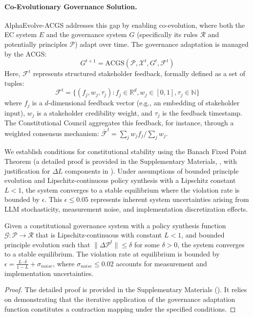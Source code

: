 \documentclass[manuscript,screen,review,anonymous,9pt]{acmart}
\begin{document}
\paragraph{Co-Evolutionary Governance Solution.} AlphaEvolve-ACGS addresses this gap by enabling co-evolution, where both the EC system $E$ and the governance system $G$ (specifically its rules $\mathcal{R}$ and potentially principles $\mathcal{P}$) adapt over time. The governance adaptation is managed by the ACGS:
\[G^{t+1} = \text{ACGS}(\mathcal{P}, \mathcal{X}^t, G^t, \mathcal{F}^t)\]
Here, $\mathcal{F}^t$ represents structured stakeholder feedback, formally defined as a set of tuples:
\[\mathcal{F}^t = \{(f_j, w_j, \tau_j) : f_j \in \mathbb{R}^d, w_j \in [0,1], \tau_j \in \mathbb{N}\}\]
where $f_j$ is a $d$-dimensional feedback vector (e.g., an embedding of stakeholder input), $w_j$ is a stakeholder credibility weight, and $\tau_j$ is the feedback timestamp. The Constitutional Council aggregates this feedback, for instance, through a weighted consensus mechanism: $\bar{\mathcal{F}}^t = \sum_{j} w_j f_j / \sum_{j} w_j$.

We establish conditions for constitutional stability using the Banach Fixed Point Theorem (a detailed proof is provided in the Supplementary Materials, , with justification for $\Delta L$ components in ). Under assumptions of bounded principle evolution and Lipschitz-continuous policy synthesis with a Lipschitz constant $L < 1$, the system converges to a stable equilibrium where the violation rate is bounded by $\epsilon$. This $\epsilon \leq 0.05$ represents inherent system uncertainties arising from LLM stochasticity, measurement noise, and implementation discretization effects.

\begin{theorem}
\label{thm:constitutional_stability}
Given a constitutional governance system with a policy synthesis function $\mathcal{G}: \mathcal{P} \rightarrow \mathcal{R}$ that is Lipschitz-continuous with constant $L < 1$, and bounded principle evolution such that $\|\Delta \mathcal{P}^t\| \leq \delta$ for some $\delta > 0$, the system converges to a stable equilibrium. The violation rate at equilibrium is bounded by $\epsilon = \frac{L \cdot \delta}{1-L} + \sigma_{noise}$, where $\sigma_{noise} \leq 0.02$ accounts for measurement and implementation uncertainties.
\end{theorem}
\begin{proof}
The detailed proof is provided in the Supplementary Materials (). It relies on demonstrating that the iterative application of the governance adaptation function constitutes a contraction mapping under the specified conditions.
\end{proof}
\end{document}
